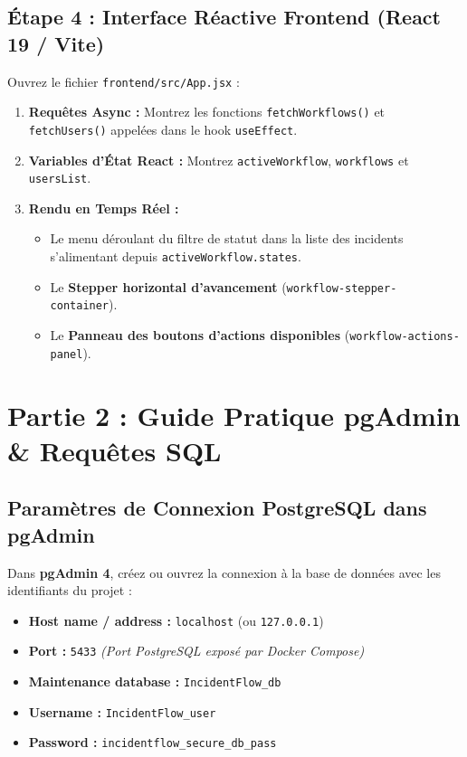 \documentclass[11pt,a4paper]{article}
\begin{document}
\subsection{Étape 4 : Interface Réactive Frontend (React 19 / Vite)}
Ouvrez le fichier \texttt{frontend/src/App.jsx} :
\begin{enumerate}
    \item \textbf{Requêtes Async :} Montrez les fonctions \texttt{fetchWorkflows()} et \texttt{fetchUsers()} appelées dans le hook \texttt{useEffect}.
    \item \textbf{Variables d'État React :} Montrez \texttt{activeWorkflow}, \texttt{workflows} et \texttt{usersList}.
    \item \textbf{Rendu en Temps Réel :}
    \begin{itemize}
        \item Le menu déroulant du filtre de statut dans la liste des incidents s'alimentant depuis \texttt{activeWorkflow.states}.
        \item Le \textbf{Stepper horizontal d'avancement} (\texttt{workflow-stepper-container}).
        \item Le \textbf{Panneau des boutons d'actions disponibles} (\texttt{workflow-actions-panel}).
    \end{itemize}
\end{enumerate}

\section{Partie 2 : Guide Pratique pgAdmin \& Requêtes SQL}

\subsection{Paramètres de Connexion PostgreSQL dans pgAdmin}
Dans \textbf{pgAdmin 4}, créez ou ouvrez la connexion à la base de données avec les identifiants du projet :

\begin{tcolorbox}[colback=blueaccent!5,colframe=blueaccent,arc=4pt,title=\textbf{Identifiants de Connexion pgAdmin}]
\begin{itemize}
    \item \textbf{Host name / address :} \texttt{localhost} (ou \texttt{127.0.0.1})
    \item \textbf{Port :} \texttt{5433} \textit{(Port PostgreSQL exposé par Docker Compose)}
    \item \textbf{Maintenance database :} \texttt{IncidentFlow\_db}
    \item \textbf{Username :} \texttt{IncidentFlow\_user}
    \item \textbf{Password :} \texttt{incidentflow\_secure\_db\_pass}
\end{itemize}
\end{tcolorbox}
\end{document}

